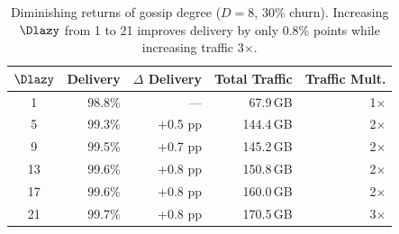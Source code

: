 \begin{table}[t]
      \centering
      \small
      \renewcommand{\arraystretch}{0.85}
      \caption{Diminishing returns of gossip degree ($D{=}8$, 30\% churn).
            Increasing $\Dlazy$ from 1 to 21 improves delivery by only
            0.8\% points while increasing traffic 3$\times$.}
      \label{tab:gossip-cost}
      \begin{tabular}{crrrr}
            \toprule
            $\Dlazy$ & Delivery & $\Delta$ Delivery & Total Traffic & Traffic Mult. \\
            \midrule
            1        & 98.8\%   & ---               & 67.9\,GB      & 1$\times$     \\
            5        & 99.3\%   & +0.5 pp           & 144.4\,GB     & 2$\times$     \\
            9        & 99.5\%   & +0.7 pp           & 145.2\,GB     & 2$\times$     \\
            13       & 99.6\%   & +0.8 pp           & 150.8\,GB     & 2$\times$     \\
            17       & 99.6\%   & +0.8 pp           & 160.0\,GB     & 2$\times$     \\
            21       & 99.7\%   & +0.8 pp           & 170.5\,GB     & 3$\times$     \\
            \bottomrule
      \end{tabular}
\end{table}